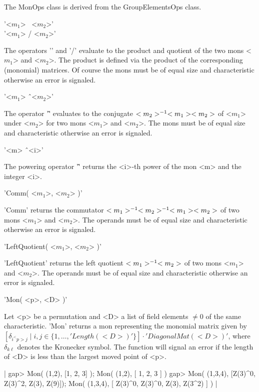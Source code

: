 
The MonOps class is derived from the GroupElementsOps class.

\bigskip
'<$m_1$> \*\ <$m_2$>'\\
'<$m_1$> / <$m_2$>'

The operators  '\*' and '/' evaluate to the product and quotient of  the
two mons <$m_1$> and <$m_2$>. The product is defined via the product of 
the corresponding (monomial) matrices. Of course the mons must be of
equal size and characteristic otherwise an error is signaled.

\bigskip
'<$m_1$> \^\ <$m_2$>'%

The operator '\^' evaluates to the conjugate 
$<m_2>^{-1}\* <m_1>\* <m_2>$  of
<$m_1$> under <$m_2$> for two mons <$m_1$> and <$m_2$>. 
The mons must be of equal size and characteristic 
otherwise an error is signaled.

\bigskip
'<m> \^\ <i>'%

The powering operator  '\^' returns the  <i>-th power  of the mon
<m> and the integer <i>. 

\bigskip
'Comm( <$m_1$>, <$m_2$> )'%

'Comm'  returns the commutator 
$<m_1>^{-1}\*  <m_2>^{-1}\* <m_1>\*<m_2>$ of two
mons <$m_1$> and <$m_2$>. The operands must be of equal size
and characteristic otherwise an error is signaled.

\bigskip
'LeftQuotient( <$m_1$>, <$m_2$> )'%

'LeftQuotient' returns the  left quotient $<m_1>^{-1}\*<m_2>$ of two 
mons <$m_1$> and <$m_2$>. The operands must be of equal size
and characteristic otherwise an error is signaled.


'Mon( <p>, <D> )'

Let <p> be a permutation and <D> a list of field elements $\neq 0$ of
the same characteristic. 'Mon' returns a mon representing the
monomial matrix given by 
$[\delta_{i^<p>j}\mid i,j\in\{1,\dots,'Length( <D> )'\}]\cdot 
'DiagonalMat( <D> )'$, where $\delta_{k\ell}$ denotes the 
Kronecker symbol. The function will signal an error if 
the length of <D> is less than the largest moved point of <p>.

|    gap> Mon( (1,2), [1, 2, 3] );
    Mon(
      (1,2),
      [ 1, 2, 3 ]
    )
    gap> Mon( (1,3,4), [Z(3)^0, Z(3)^2, Z(3), Z(9)]);
    Mon(
      (1,3,4),
      [ Z(3)^0, Z(3)^0, Z(3), Z(3^2) ]
    ) |


